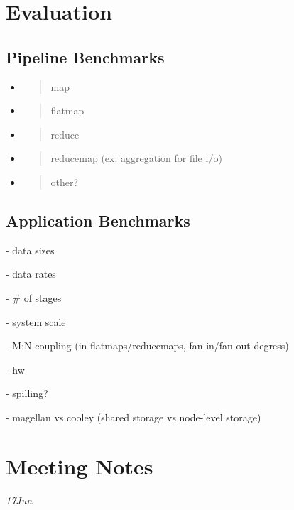 \section{Evaluation}\label{evaluation}

\subsection{Pipeline Benchmarks}\label{pipeline-benchmarks}

\begin{itemize}
\item
  \begin{quote}
  map
  \end{quote}
\item
  \begin{quote}
  flatmap
  \end{quote}
\item
  \begin{quote}
  reduce
  \end{quote}
\item
  \begin{quote}
  reducemap (ex: aggregation for file i/o)
  \end{quote}
\item
  \begin{quote}
  other?
  \end{quote}
\end{itemize}

\subsection{Application Benchmarks}\label{application-benchmarks}

- data sizes

- data rates

- \# of stages

- system scale

- M:N coupling (in flatmaps/reducemaps, fan-in/fan-out degress)

- hw

- spilling?

- magellan vs cooley (shared storage vs node-level storage)

\section{Meeting Notes}\label{meeting-notes}

\emph{17Jun}

